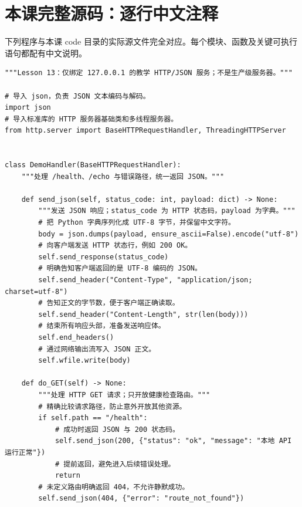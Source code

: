 \documentclass[UTF8,11pt,a4paper]{ctexart}
\begin{document}
\section{本课完整源码：逐行中文注释}
下列程序与本课 code 目录的实际源文件完全对应。每个模块、函数及关键可执行语句都配有中文说明。
\begin{Verbatim}[fontsize=\scriptsize,breaklines=true,breakanywhere=true]
"""Lesson 13：仅绑定 127.0.0.1 的教学 HTTP/JSON 服务；不是生产级服务器。"""

# 导入 json，负责 JSON 文本编码与解码。
import json
# 导入标准库的 HTTP 服务器基础类和多线程服务器。
from http.server import BaseHTTPRequestHandler, ThreadingHTTPServer


class DemoHandler(BaseHTTPRequestHandler):
    """处理 /health、/echo 与错误路径，统一返回 JSON。"""

    def send_json(self, status_code: int, payload: dict) -> None:
        """发送 JSON 响应；status_code 为 HTTP 状态码，payload 为字典。"""
        # 把 Python 字典序列化成 UTF-8 字节，并保留中文字符。
        body = json.dumps(payload, ensure_ascii=False).encode("utf-8")
        # 向客户端发送 HTTP 状态行，例如 200 OK。
        self.send_response(status_code)
        # 明确告知客户端返回的是 UTF-8 编码的 JSON。
        self.send_header("Content-Type", "application/json; charset=utf-8")
        # 告知正文的字节数，便于客户端正确读取。
        self.send_header("Content-Length", str(len(body)))
        # 结束所有响应头部，准备发送响应体。
        self.end_headers()
        # 通过网络输出流写入 JSON 正文。
        self.wfile.write(body)

    def do_GET(self) -> None:
        """处理 HTTP GET 请求；只开放健康检查路由。"""
        # 精确比较请求路径，防止意外开放其他资源。
        if self.path == "/health":
            # 成功时返回 JSON 与 200 状态码。
            self.send_json(200, {"status": "ok", "message": "本地 API 运行正常"})
            # 提前返回，避免进入后续错误处理。
            return
        # 未定义路由明确返回 404，不允许静默成功。
        self.send_json(404, {"error": "route_not_found"})


\end{Verbatim}
\end{document}

